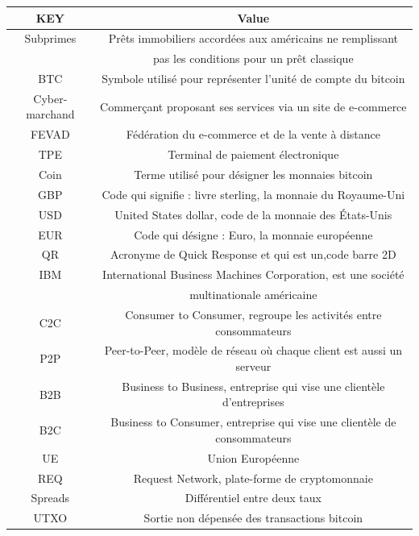 \documentclass[12pt]{report}
\begin{document}
\begin{tabular}{|c|c|}
\hline 
\rowcolor{green}KEY & Value \\

\hline
Subprimes & Prêts immobiliers accordées aux américains ne remplissant \\ & pas les conditions pour un prêt classique \\ 

\hline 
BTC & Symbole utilisé pour représenter l'unité de compte du bitcoin \\

\hline
Cyber-marchand & Commerçant proposant ses services via un site de e-commerce \\

\hline
FEVAD & Fédération du e-commerce et de la vente à distance\\

\hline
TPE & Terminal de paiement électronique\\

\hline
Coin & Terme utilisé pour désigner les monnaies bitcoin\\

\hline
GBP & Code qui signifie : livre sterling, la monnaie du Royaume-Uni\\

\hline
USD & United States dollar, code de la monnaie des États-Unis \\

\hline
EUR & Code qui désigne : Euro, la monnaie européenne \\

\hline
QR & Acronyme de Quick Response et qui est un,code barre 2D\\

\hline
IBM & International Business Machines Corporation, est une société \\ & multinationale américaine\\

\hline
C2C & Consumer to Consumer, regroupe les activités entre consommateurs\\  

\hline
P2P & Peer-to-Peer, modèle de réseau où chaque client est aussi un serveur\\

\hline
B2B & Business to Business, entreprise qui vise une clientèle d'entreprises\\

\hline
B2C & Business to Consumer, entreprise qui vise une clientèle de consommateurs\\

\hline
UE & Union Européenne \\

\hline
REQ & Request Network, plate-forme de cryptomonnaie\\

\hline
Spreads & Différentiel entre deux taux\\

\hline
UTXO & Sortie non dépensée des transactions bitcoin\\

\hline 
\end{tabular} 
\end{document}
